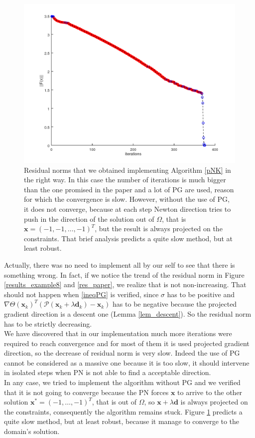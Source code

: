 \begin{figure}[h]
	\centering
	\includegraphics[width=0.8\linewidth]{res_our}
	\caption[Plot of residuals found by us]{Residual norms that we obtained implementing Algorithm \ref{pNK} in the right way. In this case the number of iterations is much bigger than the one promised in the paper and a lot of PG are used, reason for which the convergence is slow. However, without the use of PG, it does not converge, because at each step Newton direction tries to push in the direction of the solution out of $ \Omega $, that is $ \textbf{x} =(-1, -1, \dots, -1 )^T  $, but the result is always projected on the constraints. That brief analysis predicts a quite slow method, but at least robust. }
	\label{res_our}
\end{figure}
Actually, there was no need to implement all by our self to see that there is something wrong. In fact, if we notice the trend of the residual norm in Figure \ref{results_example8} and \ref{res_paper}, we realize that is not non-increasing. That should not happen when \eqref{ineqPG} is verified, since $ \sigma $ has to be positive and $\nabla \Theta(\textbf{x}_k)^T (\mathcal{P}(\textbf{x}_k + \lambda \textbf{d}_k)- \textbf{x}_k)  $ has to be negative because the projected gradient direction is a descent one (Lemma \ref{lem_descent}). So the residual norm has to be strictly decreasing. \\
We have discovered that in our implementation much more iterations were required to reach convergence and for most of them it is used projected gradient direction, so the decrease of residual norm is very slow. Indeed the use of PG cannot be considered as a massive one because it is too slow, it should intervene in isolated steps when PN is not able to find a acceptable direction. \\
In any case, we tried to implement the algorithm without PG and we verified that it is not going to converge because the PN forces $\textbf{x} $ to arrive to the other solution $ \textbf{x}^* = (-1, \dots, -1)^T$, that is out of $ \Omega $, so $ \textbf{x} + \lambda \textbf{d} $ is always projected on the constraints, consequently the algorithm remains stuck. Figure \ref{res_our} predicts a quite slow method, but at least robust, because it manage to converge to the domain's solution. 
